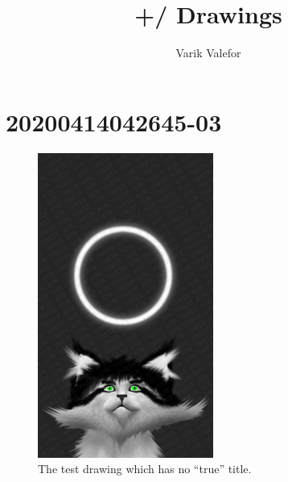 \documentclass{report}
\title{+/ Drawings}
\author{Varik Valefor}
\newcommand\imageheight{10cm}
\begin{document}
\maketitle{}
\tableofcontents{}
\chapter{20200414042645-03}
\begin{figure}[ht]
	\centering
	\includegraphics[height=\imageheight]{20200414042645-03/20200414042645-03.jpg}
	\caption[center]{The test drawing which has no ``true'' title.}
\end{figure}
\end{document}
